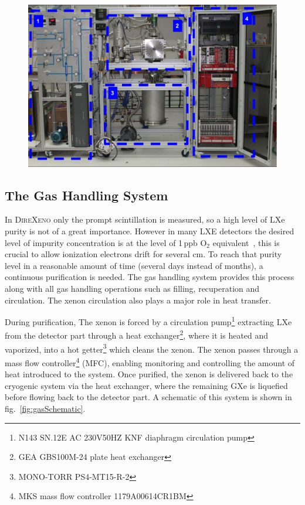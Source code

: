 \begin{figure}[h]
\centerline{\includegraphics[width=0.8\linewidth]{fig/FullSys.png}}
\end{figure}



\subsection{The Gas Handling System}
\label{subsec:gas}

In \textsc{DireXeno} only the prompt scintillation is measured, so a high level of LXe purity is not of a great importance. However in many LXE detectors the desired level of impurity concentration is at the level of 1\,ppb O$_2$ equivalent~\cite{Aprile:2009dv}, this is crucial to allow 
ionization electrons drift for several cm. To reach that purity level in a reasonable amount 
of time (several days instead of months), 
a continuous purification is needed. The gas handling system provides this process along 
with all gas handling operations such as filling, recuperation and circulation. The xenon circulation also plays a major role in heat transfer.


During purification, The xenon is forced by a circulation pump\footnote{N143 SN.12E AC 230V50HZ KNF diaphragm circulation pump} extracting LXe from the detector part through a heat exchanger\footnote{GEA GBS100M-24 plate heat exchanger},
where it is heated and vaporized, into a hot getter\footnote{MONO-TORR PS4-MT15-R-2} which cleans the xenon. The xenon passes through a mass flow controller\footnote{MKS mass flow controller 1179A00614CR1BM} (MFC), 
enabling monitoring and controlling the amount of heat introduced to the system.  Once purified, the xenon is delivered back to the cryogenic system 
via the heat exchanger, where the remaining GXe is 
liquefied before flowing back to the detector part. A schematic of this 
system is shown in fig.~\ref{fig:gasSchematic}.



